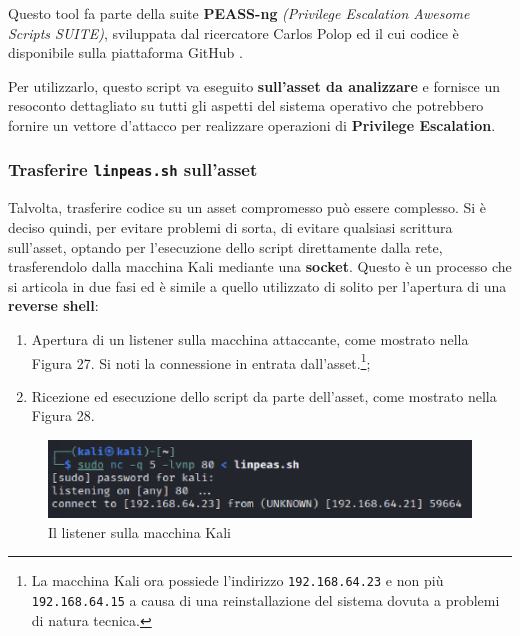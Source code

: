 \documentclass[a4paper, 12pt, oneside]{article}
\begin{document}
Questo tool fa parte della suite \textbf{PEASS-ng} \textit{(Privilege Escalation Awesome Scripts SUITE)}, sviluppata dal ricercatore Carlos Polop ed il cui codice è disponibile sulla piattaforma GitHub \cite{linpeas}.

Per utilizzarlo, questo script va eseguito \textbf{sull'asset da analizzare} e fornisce un resoconto dettagliato su tutti gli aspetti del sistema operativo che potrebbero fornire un vettore d'attacco per realizzare operazioni di \textbf{Privilege Escalation}.

\subsubsection{Trasferire \texttt{linpeas.sh} sull'asset}

Talvolta, trasferire codice su un asset compromesso può essere complesso. Si è deciso quindi, per evitare problemi di sorta, di evitare qualsiasi scrittura sull'asset, optando per l'esecuzione dello script direttamente dalla rete, trasferendolo dalla macchina Kali mediante una \textbf{socket}. Questo è un processo che si articola in due fasi ed è simile a quello utilizzato di solito per l'apertura di una \textbf{reverse shell}:

\begin{enumerate}
    \item Apertura di un listener sulla macchina attaccante, come mostrato nella Figura 27. Si noti la connessione in entrata dall'asset.\footnote{La macchina Kali ora possiede l'indirizzo \texttt{192.168.64.23} e non più \texttt{192.168.64.15} a causa di una reinstallazione del sistema dovuta a problemi di natura tecnica.};
    \item Ricezione ed esecuzione dello script da parte dell'asset, come mostrato nella Figura 28.
\end{enumerate}

\begin{figure}[h!]
    \centering
    \includegraphics[width=\textwidth]{img/listener.png}
    \caption{Il listener sulla macchina Kali}
\end{figure}
\end{document}

